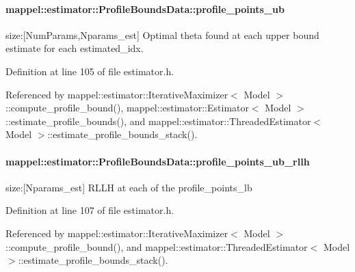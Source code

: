 \paragraph[{\texorpdfstring{profile\+\_\+points\+\_\+ub}{profile_points_ub}}]{ mappel\+::estimator\+::\+Profile\+Bounds\+Data\+::profile\+\_\+points\+\_\+ub}\hypertarget{structmappel_1_1estimator_1_1ProfileBoundsData_a51335985679f314252bac9a681e5ee4d}{}\label{structmappel_1_1estimator_1_1ProfileBoundsData_a51335985679f314252bac9a681e5ee4d}


size\+:\mbox{[}Num\+Params,Nparams\+\_\+est\mbox{]} Optimal theta found at each upper bound estimate for each estimated\+\_\+idx. 



Definition at line 105 of file estimator.\+h.



Referenced by mappel\+::estimator\+::\+Iterative\+Maximizer$<$ Model $>$\+::compute\+\_\+profile\+\_\+bound(), mappel\+::estimator\+::\+Estimator$<$ Model $>$\+::estimate\+\_\+profile\+\_\+bounds(), and mappel\+::estimator\+::\+Threaded\+Estimator$<$ Model $>$\+::estimate\+\_\+profile\+\_\+bounds\+\_\+stack().

\paragraph[{\texorpdfstring{profile\+\_\+points\+\_\+ub\+\_\+rllh}{profile_points_ub_rllh}}]{ mappel\+::estimator\+::\+Profile\+Bounds\+Data\+::profile\+\_\+points\+\_\+ub\+\_\+rllh}\hypertarget{structmappel_1_1estimator_1_1ProfileBoundsData_abaf20418fe819719e7958936e429682e}{}\label{structmappel_1_1estimator_1_1ProfileBoundsData_abaf20418fe819719e7958936e429682e}


size\+:\mbox{[}Nparams\+\_\+est\mbox{]} R\+L\+LH at each of the profile\+\_\+points\+\_\+lb 



Definition at line 107 of file estimator.\+h.



Referenced by mappel\+::estimator\+::\+Iterative\+Maximizer$<$ Model $>$\+::compute\+\_\+profile\+\_\+bound(), and mappel\+::estimator\+::\+Threaded\+Estimator$<$ Model $>$\+::estimate\+\_\+profile\+\_\+bounds\+\_\+stack().

